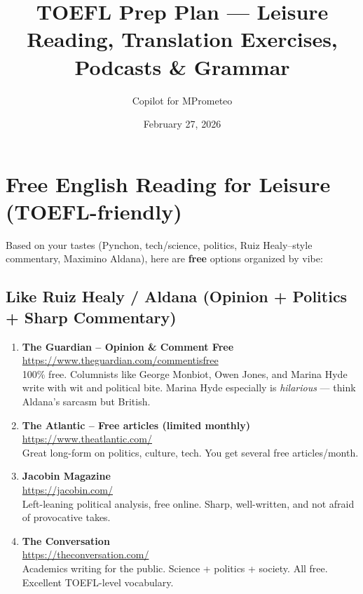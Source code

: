 \documentclass[11pt,a4paper]{article}
\title{\textbf{TOEFL Prep Plan --- Leisure Reading, Translation Exercises, Podcasts \& Grammar}}
\author{Copilot for MPrometeo}
\date{February 27, 2026}
\begin{document}
\maketitle
\tableofcontents
\newpage

\section{Free English Reading for Leisure (TOEFL-friendly)}

Based on your tastes (Pynchon, tech/science, politics, Ruiz Healy--style commentary, 
Maximino Aldana), here are \textbf{free} options organized by vibe:

\subsection{Like Ruiz Healy / Aldana (Opinion + Politics + Sharp Commentary)}
\begin{enumerate}[label=\textbf{\arabic*.}]
    \item \textbf{The Guardian -- Opinion \& Comment Free} \\
          \url{https://www.theguardian.com/commentisfree} \\
          100\% free. Columnists like George Monbiot, Owen Jones, and Marina Hyde 
          write with wit and political bite. Marina Hyde especially is \emph{hilarious} 
          --- think Aldana's sarcasm but British.
    \item \textbf{The Atlantic -- Free articles (limited monthly)} \\
          \url{https://www.theatlantic.com/} \\
          Great long-form on politics, culture, tech. You get several free articles/month.
    \item \textbf{Jacobin Magazine} \\
          \url{https://jacobin.com/} \\
          Left-leaning political analysis, free online. Sharp, well-written, and 
          not afraid of provocative takes.
    \item \textbf{The Conversation} \\
          \url{https://theconversation.com/} \\
          Academics writing for the public. Science + politics + society. 
          All free. Excellent TOEFL-level vocabulary.
\end{enumerate}
\end{document}
